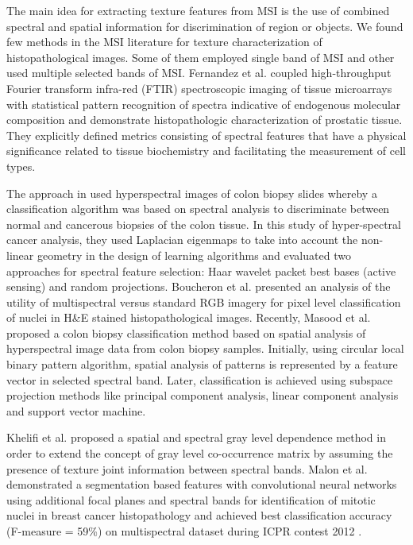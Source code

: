 \documentclass[10pt,twocolumn,letterpaper]{article}
\begin{document}
The main idea for extracting texture features from MSI is the use of combined spectral and spatial information for discrimination of region or objects. We found few methods in the MSI literature for texture characterization of histopathological images. Some of them employed single band of MSI and other used multiple selected bands of MSI. Fernandez et al. \cite{fernandez2005} coupled high-throughput Fourier transform infra-red (FTIR) spectroscopic imaging of tissue microarrays with statistical pattern recognition of spectra indicative of endogenous molecular composition and demonstrate histopathologic characterization of prostatic tissue. They explicitly defined metrics consisting of spectral features that have a physical significance related to tissue biochemistry and facilitating the measurement of cell types. 

The approach in \cite{woolfe1999} used hyperspectral images of colon biopsy slides whereby a classification algorithm was based on spectral analysis to discriminate between normal and cancerous biopsies of the colon tissue. In this study of hyper-spectral cancer analysis, they used Laplacian eigenmaps to take into account the non-linear geometry in the design of learning algorithms and evaluated two approaches for spectral feature selection: Haar wavelet packet best bases (active sensing) and random projections. Boucheron et al. \cite{boucheron2007} presented an analysis of the utility of multispectral versus standard RGB imagery for pixel level classification of nuclei in H\&E stained histopathological images. Recently, Masood et al. \cite{masood2009} proposed a colon biopsy classification method based on spatial analysis of hyperspectral image data from colon biopsy samples. Initially, using circular local binary pattern algorithm, spatial analysis of patterns is represented by a feature vector in selected spectral band. Later, classification is achieved using subspace projection methods like principal component analysis, linear component analysis and support vector machine. 

Khelifi et al. \cite{khelifi2012} proposed a spatial and spectral gray level dependence method in order to extend the concept of gray level co-occurrence matrix by assuming the presence of texture joint information between spectral bands. Malon et al. \cite{malon2013} demonstrated a segmentation based features with convolutional neural networks using additional focal planes and spectral bands for identification of mitotic nuclei in breast cancer histopathology and achieved best classification accuracy (F-measure = 59\%) on multispectral dataset during ICPR contest 2012 \cite{roux2013}.
\end{document}
